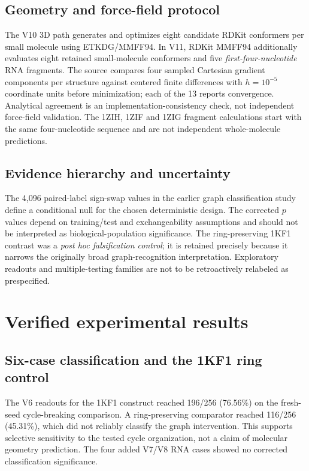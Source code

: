 \documentclass[11pt,a4paper]{article}
\begin{document}
\subsection{Geometry and force-field protocol}
The V10 3D path generates and optimizes eight candidate RDKit conformers per small molecule using ETKDG/MMFF94. In V11, RDKit MMFF94 additionally evaluates eight retained small-molecule conformers and five \emph{first-four-nucleotide} RNA fragments. The source compares four sampled Cartesian gradient components per structure against centered finite differences with $h=10^{-5}$ coordinate units before minimization; each of the 13 reports convergence. Analytical agreement is an implementation-consistency check, not independent force-field validation. The 1ZIH, 1ZIF and 1ZIG fragment calculations start with the same four-nucleotide sequence and are not independent whole-molecule predictions.

\subsection{Evidence hierarchy and uncertainty}
The 4,096 paired-label sign-swap values in the earlier graph classification study define a conditional null for the chosen deterministic design. The corrected $p$ values depend on training/test and exchangeability assumptions and should not be interpreted as biological-population significance. The ring-preserving 1KF1 contrast was a \emph{post hoc falsification control}; it is retained precisely because it narrows the originally broad graph-recognition interpretation. Exploratory readouts and multiple-testing families are not to be retroactively relabeled as prespecified.

\section{Verified experimental results}
\subsection{Six-case classification and the 1KF1 ring control}
The V6 readouts for the 1KF1 construct reached 196/256 (76.56\%) on the fresh-seed cycle-breaking comparison. A ring-preserving comparator reached 116/256 (45.31\%), which did not reliably classify the graph intervention. This supports selective sensitivity to the tested cycle organization, not a claim of molecular geometry prediction. The four added V7/V8 RNA cases showed no corrected classification significance.
\end{document}
